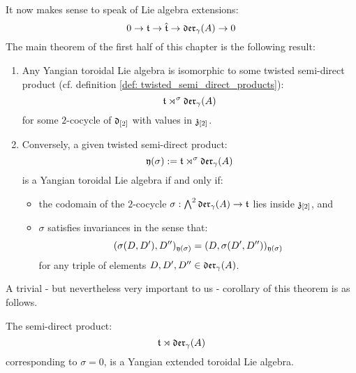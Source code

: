         It now makes sense to speak of Lie algebra extensions:
            $$0 \to \mathfrak{t} \to \hat{\mathfrak{t}} \to \mathfrak{der}_{\gamma}(A) \to 0$$
        The main theorem of the first half of this chapter is the following result:
        \begin{theorem} \label{theorem: yangian_extended_toroidal_lie_algebras_preliminary_version}
            \begin{enumerate}
                \item Any Yangian toroidal Lie algebra is isomorphic to some twisted semi-direct product (cf. definition \ref{def: twisted_semi_direct_products}):
                    $$\mathfrak{t} \rtimes^{\sigma} \mathfrak{der}_{\gamma}(A)$$
                for some $2$-cocycle of $\mathfrak{d}_{[2]}$ with values in $\mathfrak{z}_{[2]}$.
                \item Conversely, a given twisted semi-direct product:
                    $$\mathfrak{y}(\sigma) := \mathfrak{t} \rtimes^{\sigma} \mathfrak{der}_{\gamma}(A)$$
                is a Yangian toroidal Lie algebra if and only if:
                \begin{itemize}
                    \item the codomain of the $2$-cocycle $\sigma: \bigwedge^2 \mathfrak{der}_{\gamma}(A) \to \mathfrak{t}$ lies inside $\mathfrak{z}_{[2]}$, and 
                    \item $\sigma$ satisfies invariances in the sense that:
                        $$(\sigma(D, D'), D'')_{\mathfrak{y}(\sigma)} = (D, \sigma(D', D''))_{\mathfrak{y}(\sigma)}$$
                    for any triple of elements $D, D', D'' \in \mathfrak{der}_{\gamma}(A)$.
                \end{itemize}
            \end{enumerate}
        \end{theorem}
        A trivial - but nevertheless very important to us - corollary of this theorem is as follows.
        \begin{corollary}
            The semi-direct product:
                $$\mathfrak{t} \rtimes \mathfrak{der}_{\gamma}(A)$$
            corresponding to $\sigma = 0$, is a Yangian extended toroidal Lie algebra.
        \end{corollary}

